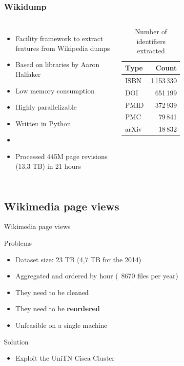 \documentclass{beamer}
\begin{document}
\begin{frame}
    \frametitle{Wikidump}
    \begin{columns}[t]
        \begin{itemize}
            \item Facility framework to extract features from Wikipedia dumps
            \item Based on libraries by Aaron Halfaker
            \item Low memory consumption
            \item Highly parallelizable
            \item Written in Python
            \item[]
            \item Processed 445M page revisions (13,3 TB) in 21 hours
        \end{itemize}
        \begin{table}
        \begin{tabular}{l r}
        \toprule
        \textbf{Type} & \textbf{Count} \\
        \midrule
        ISBN & 1\,153\,330 \\
        DOI & 651\,199 \\
        PMID & 372\,939 \\
        PMC & 79\,841 \\
        arXiv & 18\,832 \\
        \bottomrule
        \end{tabular}
        \caption{Number of identifiers extracted}
        \end{table}
    \end{columns}
\end{frame}

\subsection{Wikimedia page views}
\begin{frame}{Wikimedia page views}
    \begin{block}{Problems}
        \begin{itemize}
            \item Dataset size: 23 TB (4,7 TB for the 2014)
            \item Aggregated and ordered by hour (~8670 files per year)
            \item They need to be cleaned
            \item They need to be \textbf{reordered}
            \item Unfeasible on a single machine
        \end{itemize}
    \end{block}
    \begin{block}{Solution}
        \begin{itemize}
            \item Exploit the UniTN Cisca Cluster
        \end{itemize}
    \end{block}
\end{frame}
\end{document}
